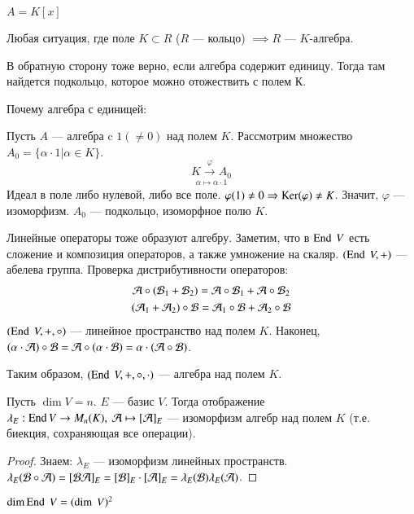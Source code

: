\documentclass[main]{subfiles}
\begin{document}
\begin{example}
    $A = K[x]$
\end{example}
\begin{example}
    Любая ситуация, где поле $K \subset R$ ($R$ —  кольцо) $\implies R$ — $K$-алгебра.

    В обратную сторону тоже верно, если алгебра содержит единицу. Тогда там найдется подкольцо, которое можно отожествить с полем К.

    Почему алгебра с единицей:

    Пусть $A$ —  алгебра c $1(\neq0)$ над полем $K$.
    Рассмотрим множество $A_0 = \{\alpha \cdot 1| \alpha \in K\}$.
     \[\underset{\alpha \mapsto \alpha\cdot1}{K \xrightarrow{\varphi} A_0 }\]
    Идеал в  поле либо нулевой, либо все поле.
    $\varphi(1) \neq 0 \Rightarrow \operatorname{Ker}(\varphi)\neq K$.
    Значит,  $\varphi$ — изоморфизм. $A_0$ — подкольцо, изоморфное полю $K$.
\end{example}


Линейные операторы тоже образуют алгебру. Заметим, что в $\operatorname{End} \ V$ есть сложение и композиция операторов, а также умножение на скаляр.
$(\operatorname{End} \ V, +)$ — абелева группа. Проверка дистрибутивности операторов:
\begin{gather*}
    \mathcal{A}\circ(\mathcal{B}_1+\mathcal{B}_2) = \mathcal{A}\circ\mathcal{B}_1 + \mathcal{A}\circ\mathcal{B}_2 \\
    (\mathcal{A}_1 + \mathcal{A}_2)\circ\mathcal{B} = \mathcal{A}_1\circ\mathcal{B}+\mathcal{A}_2\circ\mathcal{B}
\end{gather*}
$(\operatorname{End} \ V, +, \circ)$ — линейное пространство над полем $K$. Наконец,
$(\alpha\cdot\mathcal{A})\circ\mathcal{B}=\mathcal{A}\circ(\alpha\cdot\mathcal{B})=\alpha\cdot(\mathcal{A}\circ\mathcal{B})$.

Таким образом, $(\operatorname{End} \ V, +, \circ, \cdot)$ — алгебра над полем $K$.




\begin{proposition}
    Пусть $\dim V = n$. $E$ — базис $V$.
    Тогда отображение $\lambda_E : \operatorname{End} V \rightarrow M_n(K), \ \mathcal{A} \mapsto [\mathcal{A}]_E$ — изоморфизм алгебр над полем $K$ (т.е. биекция, сохраняющая все операции).
\end{proposition}

\begin{proof}
    Знаем: $\lambda_E$ — изоморфизм линейных пространств. $\lambda_E(\mathcal{B}\circ\mathcal{A})=[\mathcal{B}\mathcal{A}]_E=[\mathcal{B}]_E\cdot[\mathcal{A}]_E = \lambda_E(\mathcal{B})\lambda_E(\mathcal{A})$.
\end{proof}

\begin{corollary}
    $\dim \operatorname{End}\ V = (\dim \ V)^2 $
\end{corollary}
\end{document}

